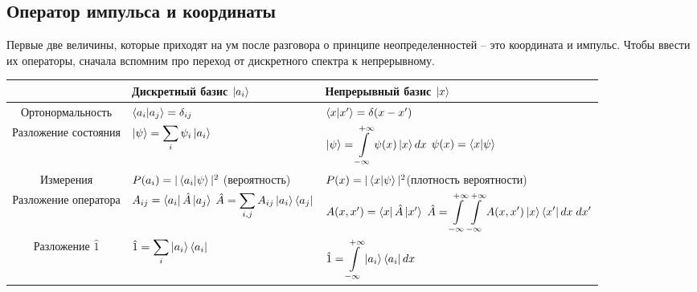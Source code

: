 \subsection{Оператор импульса и координаты}
\hspace{1em} Первые две величины, которые приходят на ум после разговора о принципе неопределенностей -- это координата и импульс. Чтобы ввести их операторы, сначала вспомним про переход от дискретного спектра к непрерывному. 
\begin{center}
\begin{tabular}{ |c|m{12em}|m{15em}| } 
 \hline
 & \textbf{Дискретный базис $\ket{a_i}$} & \textbf{Непрерывный базис $\ket{x}$} \\ 
 \hline
 Ортонормальность & $\bra{a_i} \ket{a_j} = \delta_{ij}$ & $\bra{x} \ket{x'} = \delta (x - x')$ \\ 
 \hline
 Разложение состояния & \(\displaystyle \ket{\psi} = \sum_i \psi_i \ket{a_i}\) &  \(\displaystyle \ket{\psi} = \int\limits_{-\infty}^{+\infty} \psi(x) \ket{x}dx\) \newline \(\displaystyle \psi(x) = \bra{x} \ket{\psi}\) \\ 
 \hline
 Измерения & $P(a_i) = |\bra{a_i} \ket{\psi}|^2$ \newline (вероятность) & $P(x) = |\bra{x} \ket{\psi}|^2$\newline (плотность вероятности) \\ 
 \hline
 Разложение оператора & $A_{ij} = \bra{a_i} \hat{A} \ket{a_j}$ \newline \(\displaystyle \hat{A} = \sum_{i,j} A_{ij} \ket{a_i} \bra{a_j}\) & $A(x, x') = \bra{x} \hat{A} \ket{x'}$ \newline \(\displaystyle \hat{A} = \int\limits_{-\infty}^{+\infty} \int\limits_{-\infty}^{+\infty} A(x, x') \ket{x} \bra{x'} dx \; dx'\) \\ 
 \hline
 Разложение $\hat{1}$ & \(\displaystyle \hat{1} = \sum_i \ket{a_i} \bra{a_i} \) & \(\displaystyle \hat{1} = \int\limits_{-\infty}^{+\infty} \ket{a_i} \bra{a_i} dx\) \\ 
 \hline
\end{tabular}
\end{center}

